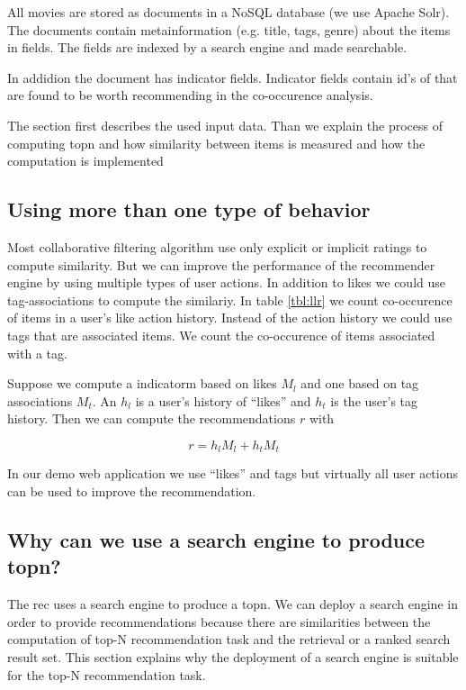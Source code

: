 All movies are stored as documents in a NoSQL database (we use Apache Solr). The documents contain metainformation (e.g. title, tags, genre) about the items in fields. The fields are indexed by a search engine and made searchable.

In addidion the document has indicator fields. Indicator fields contain id's of that are found to be worth recommending in the co-occurence analysis.

The section first describes the used input data. Than we explain the process of computing \gls{topn} and how similarity between items is measured and how the computation is implemented





\subsection{Using more than one type of behavior}
\label{sec:multimodal}

Most collaborative filtering algorithm use only explicit or implicit ratings to compute similarity.
But we can improve the performance of the recommender engine by using multiple types of user actions. In addition to likes we could use tag-associations to compute the similariy. In table \ref{tbl:llr} we count co-occurence of items in a user's like action history. Instead of the action history we could use tags that are associated items. We count the co-occurence of items associated with a tag.

Suppose we compute a \gls{indicatorm} based on likes $M_l$ and one based on tag associations $M_t$. An $h_l$ is a user's history of ``likes'' and $h_t$ is the user's tag history. Then we can compute the recommendations $r$ with

\begin{equation}
  \label{eq:multi}
  r = h_l M_l + h_t M_t
\end{equation}

In our demo web application we use ``likes'' and tags but virtually all user actions can be used to improve the recommendation.

\subsection{Why can we use a search engine to produce \gls{topn}?}
\label{sec:relation}

The \gls{rec} uses a search engine to produce a \gls{topn}. We can deploy a search engine in order to provide recommendations because there are similarities between the computation of top-N recommendation task and the retrieval or a ranked search result set.
 This section explains why the deployment of a search engine is suitable for the top-N recommendation task.

